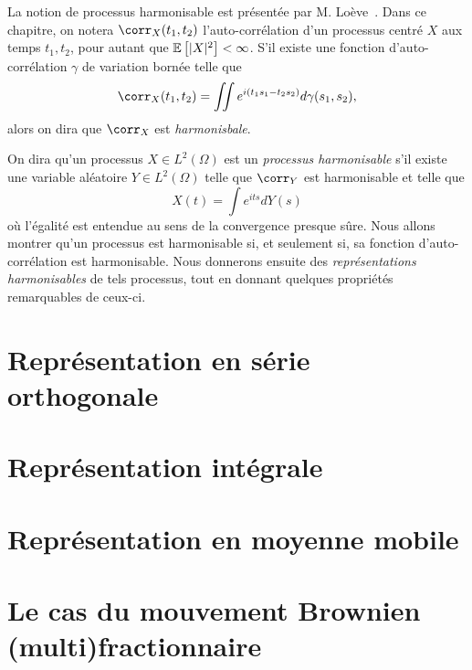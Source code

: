 
La notion de processus harmonisable est présentée par
M. Loève~\cite{loeve1945}. Dans ce chapitre, on notera
$\corr_X(t_1,t_2)$ l'auto-corrélation d'un processus centré $X$ aux
temps $t_1, t_2$, pour autant que $\mathbb{E}\left[|X|^2\right] < \infty$. S'il existe
une fonction d'auto-corrélation $\gamma$ de variation bornée telle
que
\[ \corr_X(t_1,t_2) = \iint e^{i(t_1s_1 - t_2s_2)} d\gamma(s_1,s_2)
  ,\] alors on dira que $\corr_X$ est \emph{harmonisbale}.


On dira qu'un processus $X\in L^2(\Omega)$ est un \emph{processus
  harmonisable} s'il existe une variable aléatoire $Y\in L^2(\Omega)$
telle que $\corr_Y$ est harmonisable et telle que
\[ X(t) = \int e^{its} dY(s) \] où l'égalité est entendue au sens de
la convergence presque sûre. Nous allons montrer qu'un processus est
harmonisable si, et seulement si, sa fonction d'auto-corrélation est
harmonisable. Nous donnerons ensuite des \emph{représentations
  harmonisables} de tels processus, tout en donnant quelques
propriétés remarquables de ceux-ci.


\section{Représentation en série orthogonale}
\section{Représentation intégrale}
\section{Représentation en moyenne mobile}
\section{Le cas du mouvement Brownien (multi)fractionnaire}
